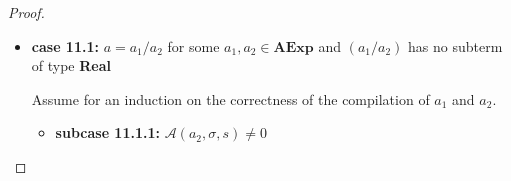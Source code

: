 \documentclass{article}
\begin{document}
\begin{proof}
\begin{itemize}
    \[
      \begin{aligned}
        \langle  \mathcal{CA}(a) : c,\, e,\, \sigma,\, s,\, pc \rangle 
        &= \langle \mathcal{CA}(a_1 - a_2) : c,\, e,\, \sigma,\, s,\, pc \rangle \\
        &= \langle \mathcal{CA}(a_2) : \mathcal{CA}(a_1) : \texttt{SUB} :  c,\, e,\, \sigma,\, s,\, pc \rangle 
        && \text{(definition of } \mathcal{CA}\text{)} \\
        &\triangleright^{\ast} \langle \mathcal{CA}(a_1) : \texttt{SUB} :  c,\, \mathcal{A}(a_2, \sigma, s) : e,\, \sigma,\, s,\, pc + l_2 \rangle 
        && \text{(induction hypothesis 2)} \\
        &\triangleright^{\ast} \langle \texttt{SUB} :  c,\, \mathcal{A}(a_1, \sigma, s) : \mathcal{A}(a_2, \sigma, s) : e,\, \sigma,\, s,\, pc + l_2 + l_1 \rangle 
        && \text{(induction hypothesis 1)} \\
        &\triangleright \langle c,\, (\mathcal{A}(a_1, \sigma, s) - \mathcal{A}(a_2, \sigma, s)) : e,\, \sigma,\, s,\, pc + l_2 + l_1 + 1 \rangle 
        && \text{(operational semantics)} \\
        &= \langle c,\, \mathcal{A}(a_1 - a_2, \sigma, s) : e,\, \sigma,\, s,\, pc + l_2 + l_1 + 1 \rangle
        && \text{(definition of } \mathcal{A}\text{)} \\
        &= \langle c,\, \mathcal{A}(a, \sigma, s) : e,\, \sigma,\, s,\, pc + l_2 + l_1 + 1 \rangle \\
      \end{aligned}
  \]

    \item \textbf{case 11.1: } $a = a_1 / a_2$ for some $a_1, a_2 \in \textbf{AExp}$ and $(a_1 / a_2)$ has no subterm of type \textbf{Real}

    Assume for an induction on the correctness of the compilation of $a_1$ and $a_2$.

        \begin{itemize}
            \item \textbf{subcase 11.1.1: } $\mathcal{A}(a_2, \sigma, s) \neq 0$


\end{itemize}
\end{itemize}
\end{proof}
\end{document}
